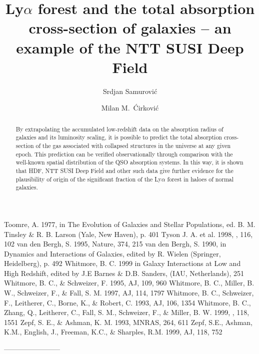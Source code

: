 {{{{{{{{{{{{{{\begin{references}
  Toomre, A. 1977, in The Evolution of Galaxies and Stellar Populations, ed. B. M. Tinsley \& R. B. Larson (Yale, New Haven), p. 401
  Tyson J. A. et al. 1998, \aj, 116, 102
  van den Bergh, S. 1995, Nature, 374, 215
  van den Bergh, S. 1990, in Dynamics and Interactions of Galaxies, edited by R. Wielen (Springer, Heidelberg), p. 492
  Whitmore, B. C. 1999 in Galaxy Interactions at Low and High Redshift, edited by J.E Barnes \& D.B. Sanders, (IAU, Netherlands), 251
  Whitmore, B. C., \& Schweizer, F. 1995, AJ, 109, 960
  Whitmore, B. C., Miller, B. W., Schweizer, F., \& Fall, S. M. 1997, AJ, 114, 1797
  Whitmore, B. C., Schweizer, F., Leitherer, C., Borne, K., \& Robert, C.  1993, AJ, 106, 1354
  Whitmore, B. C., Zhang, Q., Leitherer, C., Fall, S. M., Schweizer, F.,  \& Miller, B. W.  1999, \aj, 118, 1551
  Zepf, S. E., \& Ashman, K. M. 1993,  MNRAS, 264, 611
  Zepf, S.E., Ashman, K.M., English, J., Freeman, K.C., \& Sharples, R.M. 1999, AJ, 118, 752


\end{references}


------------------------

\title{Ly$\alpha$  forest and the total
 absorption cross-section of
galaxies -- an example of  the NTT SUSI Deep Field}

\author{Srdjan Samurovi\'c}
\author{Milan M.~\'{C}irkovi\'{c}}

\begin{abstract}
By extrapolating the accumulated low-redshift data on the absorption radius of galaxies
and its luminosity scaling, it is possible to predict the total absorption cross-section
of the gas associated with collapsed structures in the universe at any given epoch. This
prediction can be verified observationally through comparison with the well-known spatial
distribution of the QSO absorption systems. In this way, it is shown that HDF, NTT SUSI
Deep Field and other such data give further evidence for the plausibility of origin of
the significant fraction of the Ly$\alpha$ forest in haloes of normal galaxies.
\end{abstract}

}}}}}}}}}}}}}}
